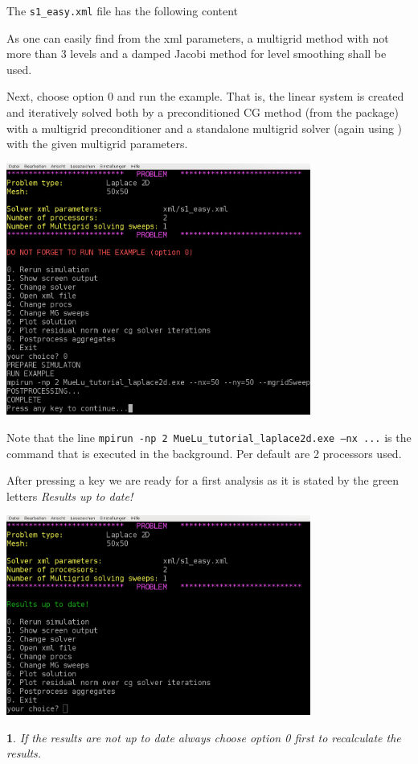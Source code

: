 \documentclass[10pt,fleqn]{book}
\newtheorem*{mycomment}{\ding{42}}
\begin{document}
The \texttt{s1\_easy.xml} file has the following content
\small

\normalsize
As one can easily find from the xml parameters, a multigrid method with not more than 3 levels and a damped Jacobi method for level smoothing shall be used.

Next, choose option 0 and run the example. That is, the linear system is created and iteratively solved both by a preconditioned CG method (from the \aztecoo package) with a \muelu multigrid preconditioner and a standalone multigrid solver (again using \muelu) with the given multigrid parameters.
\begin{center}\includegraphics[width=10cm]{pics/tut1_4.png} \end{center}
Note that the line \texttt{mpirun -np 2 MueLu\_tutorial\_laplace2d.exe --nx ...} is the command that is executed in the background. Per default are 2 processors used.

After pressing a key we are ready for a first analysis as it is stated by the green letters \textit{Results up to date!}
\begin{center}\includegraphics[width=10cm]{pics/tut1_5.png} \end{center}
\begin{mycomment}
If the results are not up to date always choose option 0 first to recalculate the results.
\end{mycomment}
\end{document}
